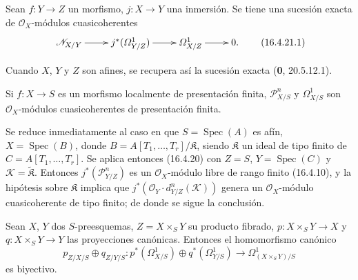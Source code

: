 \begin{corollary}[16.4.21]
\label{IV.16.4.21}
Sean $f:Y\to Z$ un morfismo, $j:X\to Y$ una inmersión. Se tiene una sucesión
exacta de $\mathcal{O}_X$-módulos cuasicoherentes
\[
  \xymatrix{
    \mathscr{N}_{X/Y}\ar[r]&j^*(\varOmega_{Y/Z}^1)\ar[r]&
    \varOmega_{X/Z}^1\ar[r]&0.
  }
  \tag{16.4.21.1}
  \label{IV.16.4.21.1}
\]
\end{corollary}

Cuando $X$, $Y$ y $Z$ son afines, se recupera así la sucesión exacta
(\textbf 0, 20.5.12.1).

\begin{corollary}[16.4.22]
\label{IV.16.4.22}
Si $f:X\to S$ es un morfismo localmente de presentación finita,
$\mathscr{P}_{X/S}^n$ y $\varOmega_{X/S}^1$ son
$\mathcal{O}_X$-módulos cuasicoherentes de presentación finita.
\end{corollary}

Se reduce inmediatamente al caso en que $S=\operatorname{Spec}(A)$ es afín,
$X=\operatorname{Spec}(B)$, donde
$B=A[T_1,\ldots,T_r]/\mathfrak{K}$, siendo $\mathfrak{K}$ un ideal de tipo
finito de $C=A[T_1,\ldots,T_r]$. Se aplica entonces (16.4.20) con $Z=S$,
$Y=\operatorname{Spec}(C)$ y $\mathscr{K}=\widetilde{\mathfrak{K}}$. Entonces
$j^*(\mathscr{P}_{Y/Z}^n)$ es un $\mathcal{O}_X$-módulo libre de rango finito
(16.4.10), y la hipótesis sobre $\mathfrak{K}$ implica que
$j^*(\mathcal{O}_Y\cdot d_{Y/Z}^n(\mathscr{K}))$ genera un
$\mathcal{O}_X$-módulo cuasicoherente de tipo finito; de donde se sigue la conclusión.

\begin{proposition}[16.4.23]
\label{IV.16.4.23}
Sean $X$, $Y$ dos $S$-preesquemas, $Z=X\times_S Y$ su producto fibrado,
$p:X\times_S Y\to X$ y $q:X\times_S Y\to Y$ las proyecciones canónicas.
Entonces el homomorfismo canónico
\[
  p_{Z/X/S}\oplus q_{Z/Y/S}:
  p^*(\varOmega_{X/S}^1)\oplus q^*(\varOmega_{Y/S}^1)
  \longrightarrow\varOmega_{(X\times_S Y)/S}^1
  \tag{16.4.23.1}
  \label{IV.16.4.23.1}
\]
es biyectivo.
\end{proposition}

